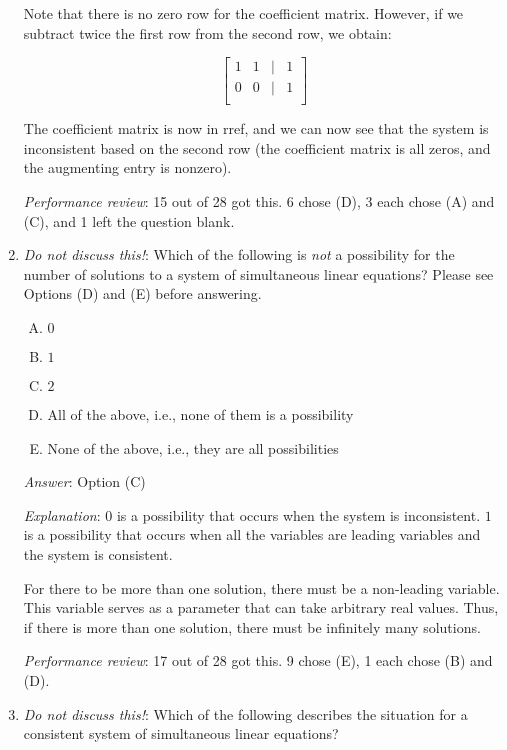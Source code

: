 \documentclass[10pt]{amsart}
\begin{document}
\begin{enumerate}
  Note that there is no zero row for the coefficient matrix. However,
  if we subtract twice the first row from the second row, we obtain:

  $$\left[\begin{matrix} 1 & 1 & \mid & 1 \\ 0 & 0 & \mid & 1 \\\end{matrix}\right]$$

  The coefficient matrix is now in rref, and we can now see that the
  system is inconsistent based on the second row (the coefficient
  matrix is all zeros, and the augmenting entry is nonzero).

  {\em Performance review}: 15 out of 28 got this. 6 chose (D), 3 each
  chose (A) and (C), and 1 left the question blank.

\item {\em Do not discuss this!}: Which of the following is {\em not} a
  possibility for the number of solutions to a system of simultaneous
  linear equations? Please see Options (D) and (E) before answering.

  \begin{enumerate}[(A)]
  \item $0$
  \item $1$
  \item $2$
  \item All of the above, i.e., none of them is a possibility
  \item None of the above, i.e., they are all possibilities
  \end{enumerate}

  {\em Answer}: Option (C)

  {\em Explanation}: $0$ is a possibility that occurs when the system
  is inconsistent. $1$ is a possibility that occurs when all the
  variables are leading variables and the system is consistent.

  For there to be more than one solution, there must be a non-leading
  variable. This variable serves as a parameter that can take
  arbitrary real values. Thus, if there is more than one solution,
  there must be infinitely many solutions.

  {\em Performance review}: 17 out of 28 got this. 9 chose (E), 1 each
  chose (B) and (D).
\item {\em Do not discuss this!}: Which of the following describes the
  situation for a consistent system of simultaneous linear equations?


\end{enumerate}
\end{document}
